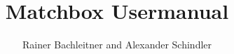 \documentclass[A4]{hitec}
\title{Matchbox Usermanual}
\author{Rainer Bachleitner and Alexander Schindler}
\begin{document}



\tableofcontents

\pagebreak

\listoffigures

\listoftables

\pagebreak



\pagebreak



\pagebreak



\pagebreak



\pagebreak



\pagebreak



\end{document}
